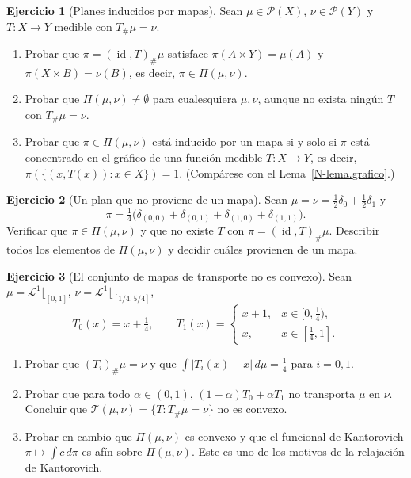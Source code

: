\documentclass[11pt,a4paper]{amsart}
\newcounter{chapter}
\newcommand{\id}{\operatorname{id}}
\newcommand{\LL}{{\mathcal L}}
\theoremstyle{remark}
\theoremstyle{definition}
\newtheorem{ejercicio}{Ejercicio}[chapter]
\numberwithin{subsection}{section}
\numberwithin{equation}{section}
\begin{document}
\begin{ejercicio}[Planes inducidos por mapas]\label{ejer.plan.inducido}
Sean $\mu\in\mathcal P(X)$, $\nu\in\mathcal P(Y)$ y $T\colon X\to Y$ medible
con $T_\#\mu=\nu$.
\begin{enumerate}[label=(\alph*)]
\item Probar que $\pi=(\id,T)_\#\mu$ satisface $\pi(A\times Y)=\mu(A)$ y
$\pi(X\times B)=\nu(B)$, es decir, $\pi\in\Pi(\mu,\nu)$.
\item Probar que $\Pi(\mu,\nu)\ne\emptyset$ para cualesquiera $\mu,\nu$,
aunque no exista ningún $T$ con $T_\#\mu=\nu$.
\item Probar que $\pi\in\Pi(\mu,\nu)$ está inducido por un mapa si y solo si
$\pi$ está concentrado en el gráfico de una función medible $T\colon X\to Y$,
es decir, $\pi(\{(x,T(x)):x\in X\})=1$. (Compárese con el
Lema~\ref{N-lema.grafico}.)
\end{enumerate}
\end{ejercicio}

\begin{ejercicio}[Un plan que no proviene de un mapa]\label{ejer.plan.no.mapa}
Sean $\mu=\nu=\frac12\delta_0+\frac12\delta_1$ y
\[
\pi=\tfrac14\bigl(\delta_{(0,0)}+\delta_{(0,1)}+\delta_{(1,0)}+\delta_{(1,1)}\bigr).
\]
Verificar que $\pi\in\Pi(\mu,\nu)$ y que no existe $T$ con
$\pi=(\id,T)_\#\mu$. Describir todos los elementos de $\Pi(\mu,\nu)$ y
decidir cuáles provienen de un mapa.
\end{ejercicio}

\begin{ejercicio}[El conjunto de mapas de transporte no es convexo]\label{ejer.mapas.no.convexo}
Sean $\mu=\LL^1\lfloor_{[0,1]}$, $\nu=\LL^1\lfloor_{[1/4,5/4]}$,
\[
T_0(x)=x+\tfrac14,
\qquad
T_1(x)=\begin{cases}x+1,&x\in[0,\tfrac14),\\ x,&x\in[\tfrac14,1].\end{cases}
\]
\begin{enumerate}[label=(\alph*)]
\item Probar que $(T_i)_\#\mu=\nu$ y que $\int|T_i(x)-x|\,d\mu=\tfrac14$
para $i=0,1$.
\item Probar que para todo $\alpha\in(0,1)$, $(1-\alpha)T_0+\alpha T_1$ no
transporta $\mu$ en $\nu$. Concluir que
$\mathcal T(\mu,\nu)=\{T:T_\#\mu=\nu\}$ no es convexo.
\item Probar en cambio que $\Pi(\mu,\nu)$ es convexo y que el funcional de
Kantorovich $\pi\mapsto\int c\,d\pi$ es afín sobre $\Pi(\mu,\nu)$. Este es
uno de los motivos de la relajación de Kantorovich.
\end{enumerate}
\end{ejercicio}
\end{document}
